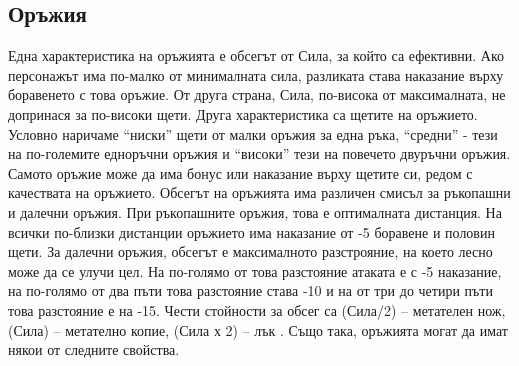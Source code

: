\subsection{Оръжия}
Една характеристика на оръжията е обсегът от Сила, за който са ефективни. Ако персонажът има по-малко от минималната сила, разликата става наказание върху боравенето с това оръжие. От друга страна, Сила, по-висока от максималната, не допринася за по-високи щети.
Друга характеристика са щетите на оръжието. Условно наричаме “ниски” щети от малки оръжия за една ръка, “средни” - тези на по-големите едноръчни оръжия и “високи” тези на повечето двуръчни оръжия.  Самото оръжие може да има бонус или наказание върху щетите си, редом с качествата на оръжието.
Обсегът на оръжията има различен смисъл за ръкопашни и далечни оръжия. При ръкопашните оръжия, това е оптималната дистанция. На всички по-близки дистанции оръжието има наказание от -5 боравене и половин щети. За далечни оръжия, обсегът е максималното разстрояние, на което лесно може да се улучи цел. На по-голямо от това разстояние атаката е с -5 наказание, на по-голямо от два пъти това разстояние става -10 и на от три до четири пъти това разстояние е на -15. Чести стойности за обсег са (Сила/2) – метателен нож, (Сила) – метателно копие, (Сила х 2) – лък .
Също така, оръжията могат да имат някои от следните свойства.

